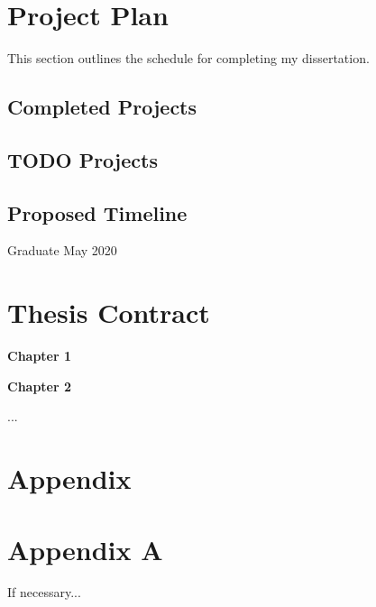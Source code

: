 \documentclass[runningheads]{llncs}
\begin{document}
\section{Project Plan}

This section outlines the schedule for completing my dissertation.

\subsection{Completed Projects}

\subsection{TODO Projects}

\subsection{Proposed Timeline}
Graduate May 2020


\section{Thesis Contract}

\begin{todolist}
  \item \textbf{Chapter 1}
  \item \textbf{Chapter 2}
  \item ...
\end{todolist}

\section{Appendix}
\appendix
\section{Appendix A}
If necessary...

%
%
%
% 
% 
%


\end{document}
